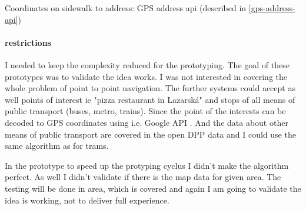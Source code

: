 	
	
	Coordinates on sidewalk to address: GPS address api (described in \ref{gps-address-api})
	
	
	\paragraph{restrictions}
	I needed to keep the complexity reduced for the prototyping. The goal of these prototypes was to validate the idea works. I was not interested in covering the whole problem of point to point navigation.
	The further systems could accept as well points of interest ie "pizza restaurant in Lazarská" and stops of all means of public transport (buses, metro, trains).
	Since the point of the interests can be decoded to GPS coordinates using i.e. Google API \cite{google-api}. And the data about other means of public transport are covered in the open DPP data \cite{dpp-data} and I could use the same algorithm as for trams.
	
	In the \gps prototype to speed up the protyping cyclus I didn't make the algorithm perfect. As well I didn't validate if there is the map data for given area. The testing will be done in area, which is covered and again I am going to validate the idea is working, not to deliver full experience.
	
	